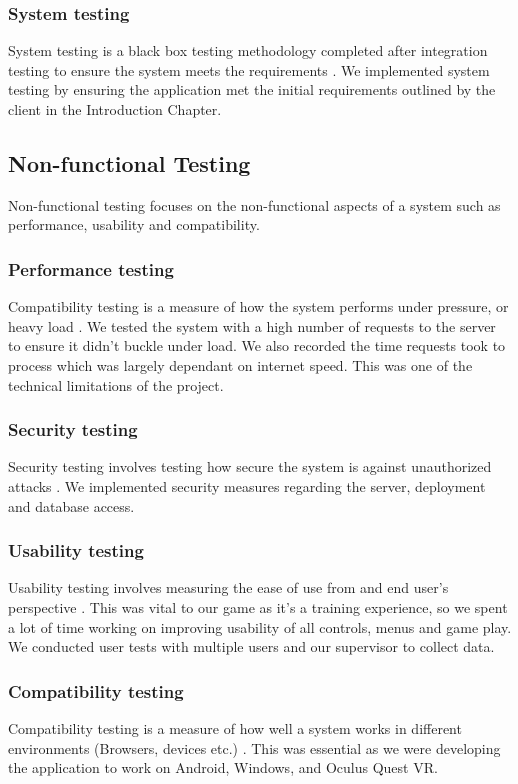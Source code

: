 \subsubsection{System testing}
System testing is a black box testing methodology completed after integration testing to ensure the system meets the requirements \cite{1028373}. We implemented system testing by ensuring the application met the initial requirements outlined by the client in the Introduction Chapter.

\subsection{Non-functional Testing}
Non-functional testing focuses on the non-functional aspects of a system such as performance, usability and compatibility.

\subsubsection{Performance testing}
Compatibility testing is a measure of how the system performs under pressure, or heavy load \cite{1028373}. We tested the system with a high number of requests to the server to ensure it didn't buckle under load. We also recorded the time requests took to process which was largely dependant on internet speed. This was one of the technical limitations of the project.

\subsubsection{Security testing}
Security testing involves testing how secure the system is against unauthorized attacks \cite{1028373}. We implemented security measures regarding the server, deployment and database access.

\subsubsection{Usability testing}
Usability testing involves measuring the ease of use from and end user’s perspective \cite{5380492}. This was vital to our game as it's a training experience, so we spent a lot of time working on improving usability of all controls, menus and game play. We conducted user tests with multiple users and our supervisor to collect data.

\subsubsection{Compatibility testing}
Compatibility testing is a measure of how well a system works in different environments (Browsers, devices etc.) \cite{5380492}. This was essential as we were developing the application to work on Android, Windows, and Oculus Quest VR.

